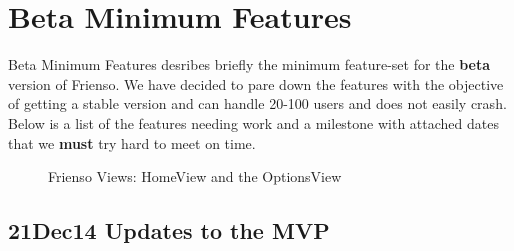 \chapter{Beta Minimum Features}

\begin{introduction}
  Beta Minimum Features desribes briefly the minimum feature-set for the \textbf{beta} version
  of Frienso.  We have decided to pare down the features with the objective of getting a 
  stable version and can handle 20-100 users and does not easily crash. Below is a list of
  the features needing work and a milestone with attached dates that we \textbf{must} try hard
  to meet on time. 
\end{introduction}
\begin{figure}[t]
\centering

\qquad
{}

\caption{Frienso Views: HomeView and the OptionsView}
\end{figure}

\section{21Dec14 Updates to the MVP}

